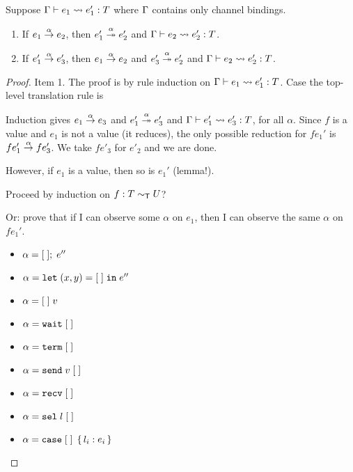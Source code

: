 \begin{lemma}
  Suppose $\Ctxt \vdash e_1 \leadsto e'_1 : T$ where $\Ctxt$ contains only
  channel bindings. \begin{enumerate}
  \item If $\reduce[\alpha]{e_1}{e_2}$, then
    $\reducemany[\alpha]{e'_1}{e'_2}$ and $\Ctxt \vdash e_2 \leadsto e'_2 : T$.
  \item If $\reduce[\alpha]{e'_1}{e'_3}$, then $\reduce[\alpha]{e_1}{e_2}$ and
    $\reducemany[\alpha]{e'_3}{e'_2}$ and $\Ctxt \vdash e_2 \leadsto e'_2 : T$.
  \end{enumerate}
\end{lemma}
\begin{proof} Item 1.
  The proof is by rule induction on $\Ctxt \vdash e_1 \leadsto e'_1 : T$.
  Case the top-level translation rule is
  \begin{mathpar}
  \end{mathpar}
  Induction gives $\reduce[\alpha]{e_1}{e_3}$ and
  $\reducemany[\alpha]{e_1'}{e'_3}$ and $\Ctxt \vdash e_1' \leadsto e'_3 : T$,
  for all $\alpha$.
  Since $f$ is a value and $e_1$ is not a value (it reduces), the only
  possible reduction for $f e_1'$ is $\reduce[\alpha]{f e_1'}{f e'_3}$.
  We take $f e'_3$ for $e'_2$ and we are done.



  However, if $e_1$ is a value, then so is $e_1'$ (lemma!). 


  Proceed by induction on $f : T \eqt U$?

  Or: prove that if I can observe some $\alpha$ on $e_1$, then I can
  observe the same $\alpha$ on $f e_1'$.

  \begin{itemize}
  \item $\alpha = \ELetU\EHole{e''}$
  \item $\alpha = \ELetP xy\EHole{e''}$
  \item $\alpha = \EHole\; v$
  \item $\alpha = \EWait\EHole$
  \item $\alpha = \ETerm\EHole$
  \item $\alpha = \ESend{v}\EHole$
  \item $\alpha = \ERecv\EHole$
  \item $\alpha = \ESelect l \EHole$
  \item $\alpha = \ECase\EHole{l_i: e_i}$
  \end{itemize}
  
\end{proof}

